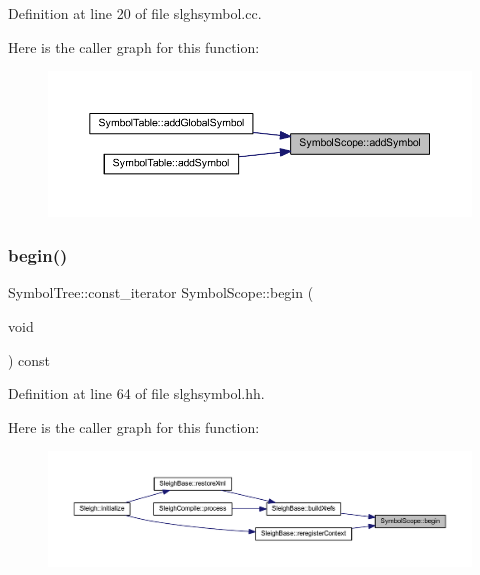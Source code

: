 Definition at line 20 of file slghsymbol.\+cc.

Here is the caller graph for this function\+:
\nopagebreak
\begin{figure}[H]
\begin{center}
\leavevmode
\includegraphics[width=350pt]{class_symbol_scope_a2cc1cecb62817eda6b3ef3000c4ade27_icgraph}
\end{center}
\end{figure}
\mbox{\label{class_symbol_scope_a3a89cb5a7be515b1ce623b91ed0935c8}} 
\subsubsection{\texorpdfstring{begin()}{begin()}}
{\footnotesize\ttfamily Symbol\+Tree\+::const\+\_\+iterator Symbol\+Scope\+::begin (\begin{DoxyParamCaption}\item[{void}]{ }\end{DoxyParamCaption}) const\hspace{0.3cm}{\ttfamily [inline]}}



Definition at line 64 of file slghsymbol.\+hh.

Here is the caller graph for this function\+:
\nopagebreak
\begin{figure}[H]
\begin{center}
\leavevmode
\includegraphics[width=350pt]{class_symbol_scope_a3a89cb5a7be515b1ce623b91ed0935c8_icgraph}
\end{center}
\end{figure}
\mbox{\label{class_symbol_scope_afb18a2563283ed5990eefca5fdaeae94}} 
